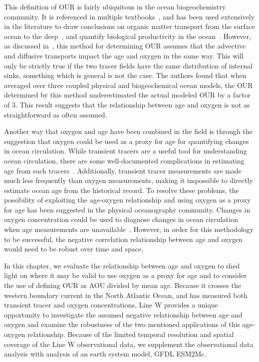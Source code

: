 This definition of OUR is fairly ubiquitous in the ocean biogeochemistry
community. It is referenced in multiple textbooks~\citep{Sarmiento2006,Emerson2008},
and has been used extensively in the literature to draw conclusions on organic
matter transport from the surface ocean to the deep~\citep{Jenkins}, and quantify
biological productivity in the ocean~\citep{Burd2010}. However, as discussed
in~\citet{Koeve2016}, this method for determining OUR assumes that the advective
and diffusive transports impact the age and oxygen in the same way. This will
only be strictly true if the two tracer fields have the same distribution of
internal sinks, something which is general is not the case. The authors found
that when averaged over three coupled physical and biogeochemical ocean models,
the OUR determined by this method underestimated the actual modeled OUR by a
factor of 3. This result suggests that the relationship between age and oxygen
is not as straightforward as often assumed.

Another way that oxygen and age have been combined in the field is through the
suggestion that oxygen could be used as a proxy for age for quantifying changes
in ocean circulation. While transient tracers are a useful tool for understanding
ocean circulation, there are some well-documented complications in estimating age
from such tracers~\citep{Haine2002}. Additionally, transient tracer
measurements are made much less frequently than oxygen measurements, making it
impossible to directly estimate ocean age from the historical record. To resolve
these problems, the possibility of exploiting the age-oxygen relationship and
using oxygen as a proxy for age has been suggested in the physical oceanography
community. Changes in oxygen concentration could be used to diagnose changes in
ocean circulation when age measurements are unavailable~\citep{Deutsch2005,Kwon2016}.
However, in order for this methodology to be successful, the negative correlation
relationship between age and oxygen would need to be robust over time and space.

In this chapter, we evaluate the relationship between age and oxygen to shed
light on where it may be valid to use oxygen as a proxy for age and to consider
the use of defining OUR as AOU divided by mean age. Because it crosses the western
boundary current in the North Atlantic Ocean, and has measured both transient
tracer and oxygen concentrations, Line W provides a unique opportunity to
investigate the assumed negative relationship between age and oxygen and examine
the robustness of the two mentioned applications of this age-oxygen relationship.
Because of the limited temporal resolution and spatial coverage of the Line W
observational data, we supplement the observational data analysis with analysis
of an earth system model, GFDL ESM2Mc.

